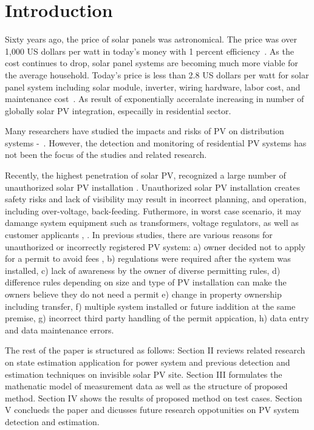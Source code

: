 \section{Introduction}


Sixty years ago, the price of solar panels was astronomical.  The price was over 1,000 US dollars per watt in today's money with 1 percent efficiency~\cite{b18}.
As the cost continues to drop, solar panel systems are becoming much more viable for the average household.
Today's price is less than 2.8 US dollars per watt for solar panel system including solar module, inverter, wiring hardware, labor cost, and maintenance cost~\cite{b19}.
As result of exponentially acceralate increasing in number of globally solar PV integration, especailly in residential sector.


Many researchers have studied the impacts and risks of PV on distribution systems \cite{b20}-~\cite{b25}.
However, the detection and monitoring of residential PV systems has not been the focus of the studies and related research.

Recently, the highest penetration of solar PV, recognized a large number of unauthorized solar PV installation \cite{b26}.
Unauthorized solar PV installation creates safety risks and lack of visibility may result in incorrect planning, and operation, including over-voltage, back-feeding.
Futhermore, in worst case scenario, it may damange system equipment such as transformers, voltage regulators, as well as customer applicants \cite{b15}, \cite{b16}.
In previous studies, there are various reasons for unauthorized or incorrectly registered PV system:
a) owner decided not to apply for a permit to avoid fees \cite{b17},
b) regulations were required after the system was installed,
c) lack of awareness by the owner of diverse permitting rules,
d) difference rules depending on size and type of PV installation can make the owners believe they do not need a permit
e) change in property ownership including transfer,
f) multiple system installed or future iaddition at the same premise,
g) incorrect third party handling of the permit appication,
h) data entry and data maintenance errors.





The rest of the paper is structured as follows: Section II reviews related research on state estimation application for power system and previous detection and estimation techniques on invisible solar PV site.
Section III formulates the mathenatic model of measurement data as well as the structure of proposed method.
Section IV shows the results of proposed method on test cases.
Section V conclueds the paper and dicusses future research oppotunities on PV system detection and estimation.
